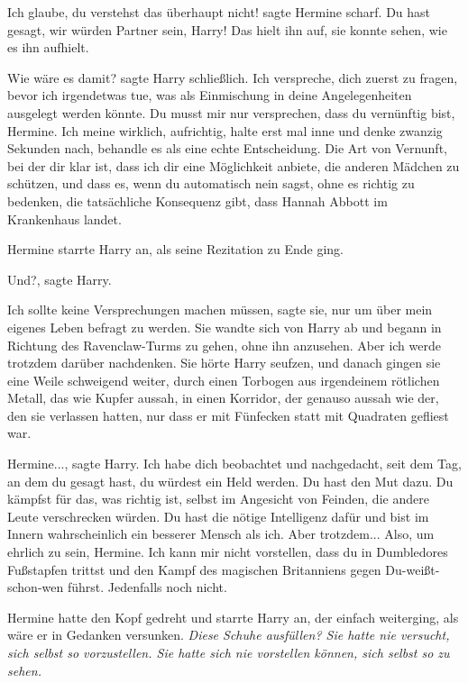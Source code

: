 \glqq Ich glaube, du verstehst das überhaupt nicht!\grqq{} sagte Hermine scharf.
\glqq Du hast gesagt, wir würden Partner sein, Harry!\grqq{} Das hielt ihn auf,
sie konnte sehen, wie es ihn aufhielt.

\glqq Wie wäre es damit?\grqq{} sagte Harry schließlich. \glqq Ich verspreche,
dich zuerst zu fragen, bevor ich irgendetwas tue, was als Einmischung in deine
Angelegenheiten ausgelegt werden könnte. Du musst mir nur versprechen, dass du
vernünftig bist, Hermine. Ich meine wirklich, aufrichtig, halte erst mal inne
und denke zwanzig Sekunden nach, behandle es als eine echte Entscheidung. Die
Art von Vernunft, bei der dir klar ist, dass ich dir eine Möglichkeit anbiete,
die anderen Mädchen zu schützen, und dass es, wenn du automatisch nein sagst,
ohne es richtig zu bedenken, die tatsächliche Konsequenz gibt, dass Hannah
Abbott im Krankenhaus landet.\grqq{}

Hermine starrte Harry an, als seine Rezitation zu Ende ging.

\glqq Und?\grqq{}, sagte Harry.

\glqq Ich sollte keine Versprechungen machen müssen\grqq{}, sagte sie, \glqq nur
um über mein eigenes Leben befragt zu werden.\grqq{} Sie wandte sich von Harry
ab und begann in Richtung des Ravenclaw-Turms zu gehen, ohne ihn anzusehen.
\glqq Aber ich werde trotzdem darüber nachdenken.\grqq{} Sie hörte Harry
seufzen, und danach gingen sie eine Weile schweigend weiter, durch einen
Torbogen aus irgendeinem rötlichen Metall, das wie Kupfer aussah, in einen
Korridor, der genauso aussah wie der, den sie verlassen hatten, nur dass er mit
Fünfecken statt mit Quadraten gefliest war.

\glqq Hermine...\grqq{}, sagte Harry. \glqq Ich habe dich beobachtet und
nachgedacht, seit dem Tag, an dem du gesagt hast, du würdest ein Held werden. Du
hast den Mut dazu. Du kämpfst für das, was richtig ist, selbst im Angesicht von
Feinden, die andere Leute verschrecken würden. Du hast die nötige Intelligenz
dafür und bist im Innern wahrscheinlich ein besserer Mensch als ich. Aber
trotzdem... Also, um ehrlich zu sein, Hermine. Ich kann mir nicht vorstellen,
dass du in Dumbledores Fußstapfen trittst und den Kampf des magischen
Britanniens gegen Du-weißt-schon-wen führst. Jedenfalls noch nicht.\grqq{}

Hermine hatte den Kopf gedreht und starrte Harry an, der einfach weiterging, als
wäre er in Gedanken versunken. \emph{Diese Schuhe ausfüllen? Sie hatte nie
versucht, sich selbst so vorzustellen. Sie hatte sich nie vorstellen können,
sich selbst so zu sehen.}

